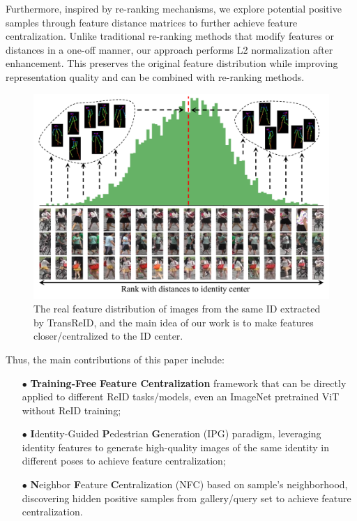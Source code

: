 Furthermore, inspired by re-ranking mechanisms\cite{zhong2017re}, we explore potential positive samples through feature distance matrices to further achieve feature centralization. Unlike traditional re-ranking methods that modify features or distances in a one-off manner, our approach performs L2 normalization after enhancement. This preserves the original feature distribution while improving representation quality and can be combined with re-ranking methods.
\begin{figure}
\centering
\includegraphics[width=0.85\linewidth]{figs/pdf/intro.pdf}
\caption{The real feature distribution of images from the same ID extracted by TransReID, and the main idea of our work is to make features closer/centralized to the ID center.}
\label{fig:intro}
\end{figure}

Thus, the main contributions of this paper include:
\begin{itemize}
    \item[$\bullet$]\textbf{Training-Free} \textbf{Feature Centralization} framework that can be directly applied to different ReID tasks/models, even an ImageNet pretrained ViT without ReID training;
    \item[$\bullet$]\textbf{I}dentity-Guided \textbf{P}edestrian \textbf{G}eneration (IPG) paradigm, leveraging identity features to generate high-quality images of the same identity in different poses to achieve feature centralization;
    \item[$\bullet$]\textbf{N}eighbor \textbf{F}eature \textbf{C}entralization (NFC) based on sample's neighborhood, discovering hidden positive samples from gallery/query set to achieve feature centralization.
\end{itemize}










